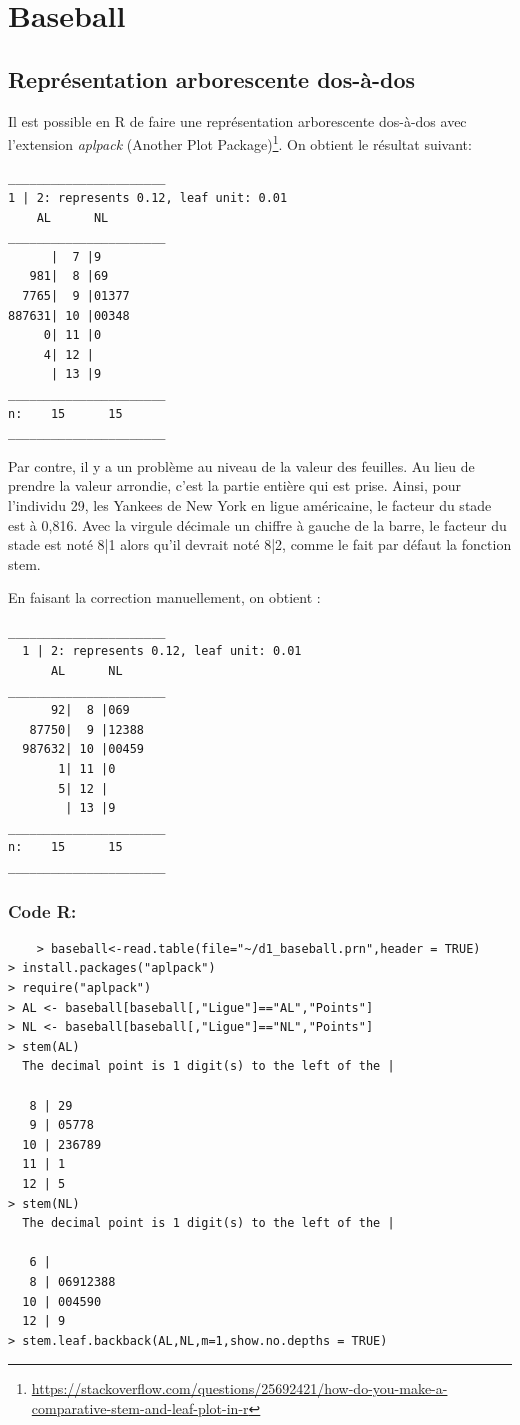 \documentclass[10pt,twocolumn]{article}
\begin{document}
\section{Baseball}
\subsection{Représentation arborescente dos-à-dos}
Il est possible en R de faire une représentation arborescente dos-à-dos avec l’extension \textit{aplpack} (Another Plot Package)\footnote{\url{https://stackoverflow.com/questions/25692421/how-do-you-make-a-comparative-stem-and-leaf-plot-in-r}}. On obtient le résultat suivant:
\begin{verbatim}
______________________
1 | 2: represents 0.12, leaf unit: 0.01 
    AL      NL  
______________________
      |  7 |9       
   981|  8 |69      
  7765|  9 |01377   
887631| 10 |00348   
     0| 11 |0       
     4| 12 |        
      | 13 |9       
______________________
n:    15      15  
______________________ 
\end{verbatim}

Par contre, il y a un problème au niveau de la valeur des feuilles. Au lieu de prendre la valeur arrondie, c’est la partie entière qui est prise. Ainsi, pour l’individu 29, les Yankees de New York en ligue américaine, le facteur du stade est à 0,816. Avec la virgule décimale un chiffre à gauche de la barre, le facteur du stade est noté 8|1 alors qu’il devrait noté 8|2, comme le fait par défaut la fonction stem.

En faisant la correction manuellement, on obtient :
\begin{verbatim}
______________________
  1 | 2: represents 0.12, leaf unit: 0.01 
      AL      NL  
______________________
      92|  8 |069      
   87750|  9 |12388   
  987632| 10 |00459  
       1| 11 |0       
       5| 12 |        
        | 13 |9       
______________________
n:    15      15  
______________________
\end{verbatim}
\subsubsection*{Code R:}
\begin{verbatim}
	> baseball<-read.table(file="~/d1_baseball.prn",header = TRUE)
> install.packages("aplpack")
> require("aplpack")
> AL <- baseball[baseball[,"Ligue"]=="AL","Points"]
> NL <- baseball[baseball[,"Ligue"]=="NL","Points"]
> stem(AL)
  The decimal point is 1 digit(s) to the left of the |

   8 | 29
   9 | 05778
  10 | 236789
  11 | 1
  12 | 5
> stem(NL)
  The decimal point is 1 digit(s) to the left of the |

   6 | 
   8 | 06912388
  10 | 004590
  12 | 9
> stem.leaf.backback(AL,NL,m=1,show.no.depths = TRUE)
\end{verbatim}
\end{document}
